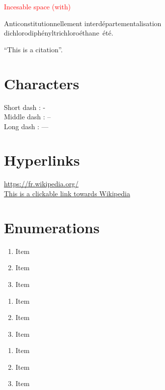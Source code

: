 \medbreak

\textcolor{red}{Incesable space (with)}

Anticonstitutionnellement interdépartementalisation dichlorodiphényltrichloroéthane~été.

\newpage

``This is a citation''.

\newpage


\section{Characters}
Short dash : - \\
Middle dash : -- \\
Long dash : --- \\

\newpage


\section{Hyperlinks}
\url{https://fr.wikipedia.org/} \\
\href{https://fr.wikipedia.org/}{This is a clickable link towards Wikipedia}

\newpage


\section{Enumerations}

\begin{enumerate}[label=\Alph*.]
    \item Item \label{item:item_A}
    \item Item
    \item Item
\end{enumerate}
\bigbreak

\begin{enumerate}[label=\Alph*)]
    \item Item
    \item Item
    \item Item
\end{enumerate}
\bigbreak

\begin{enumerate}
    \item Item
    \item Item
    \item Item
\end{enumerate}
\bigbreak

